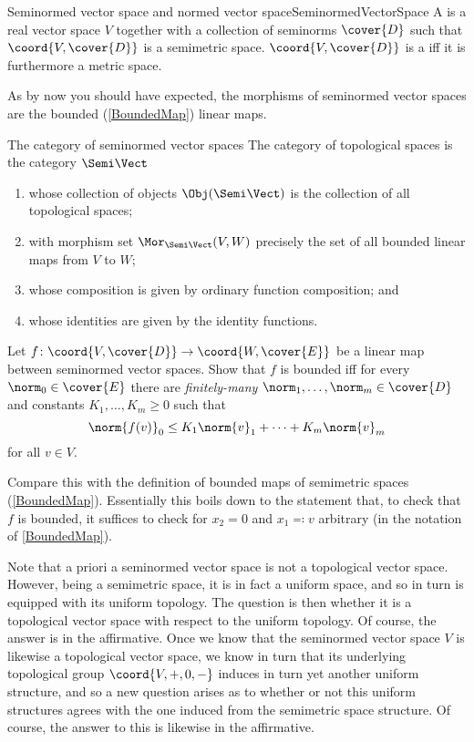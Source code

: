 \begin{dfn}{Seminormed vector space and normed vector space}{SeminormedVectorSpace}
A  is a real vector space $V$ together with a collection of seminorms $\cover{D}$ such that $\coord{V,\cover{D}}$ is a semimetric space.  $\coord{V,\cover{D}}$ is a  iff it is furthermore a metric space.
\end{dfn}
As by now you should have expected, the morphisms of seminormed vector spaces are the bounded (\cref{BoundedMap}) linear maps.
\begin{exm}{The category of seminormed vector spaces}{}
The category of topological spaces is the category $\Semi \Vect$\index[notation]{$\Semi \Vect$}
\begin{enumerate}
\item whose collection of objects $\Obj (\Semi \Vect )$ is the collection of all topological spaces;
\item with morphism set $\Mor _{\Semi \Vect}(V,W)$ precisely the set of all bounded linear maps from $V$ to $W$;
\item whose composition is given by ordinary function composition; and
\item whose identities are given by the identity functions.
\end{enumerate}
\end{exm}
\begin{exr}{}{}
Let $f\colon \coord{V,\cover{D}}\rightarrow \coord{W,\cover{E}}$ be a linear map between seminormed vector spaces.  Show that $f$ is bounded iff for every $\norm _0\in \cover{E}$ there are \emph{finitely-many} $\norm _1,\ldots ,\norm _m\in \cover{D}$ and constants $K_1,\ldots ,K_m\geq 0$ such that
\begin{equation}
\norm{f(v)}_0\leq K_1\norm{v}_1+\cdots +K_m\norm{v}_m
\end{equation}
for all $v\in V$.
\begin{rmk}
Compare this with the definition of bounded maps of semimetric spaces (\cref{BoundedMap}).  Essentially this boils down to the statement that, to check that $f$ is bounded, it suffices to check for $x_2=0$ and $x_1\eqqcolon v$ arbitrary (in the notation of \cref{BoundedMap}).
\end{rmk}
\end{exr}
Note that a priori a seminormed vector space is not a topological vector space.  However, being a semimetric space, it is in fact a uniform space, and so in turn is equipped with its uniform topology.  The question is then whether it is a topological vector space with respect to the uniform topology.  Of course, the answer is in the affirmative.  Once we know that the seminormed vector space $V$ is likewise a topological vector space, we know in turn that its underlying topological group $\coord{V,+,0,-}$ induces in turn yet another uniform structure, and so a new question arises as to whether or not this uniform structures agrees with the one induced from the semimetric space structure.  Of course, the answer to this is likewise in the affirmative.
